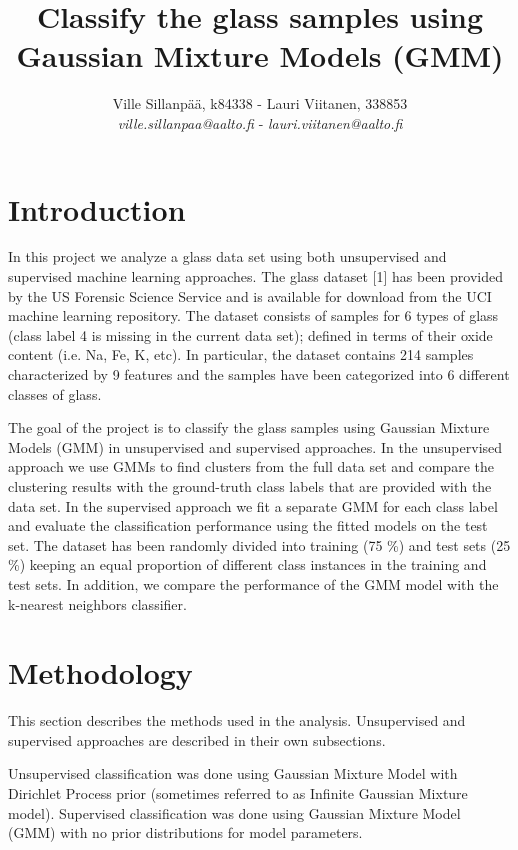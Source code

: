 \documentclass[a4paper]{article}
\title{Classify the glass samples using Gaussian Mixture Models (GMM)}
\author{Ville Sillanpää, k84338 - Lauri Viitanen, 338853 \\ 
       {\it ville.sillanpaa@aalto.fi} -
       {\it lauri.viitanen@aalto.fi}}
\begin{document}
\maketitle
\clearpage


\section{Introduction}

In this project we analyze a glass data set using both unsupervised and
supervised machine learning approaches. The glass dataset [1] has been
provided by the US Forensic Science Service and is available for download from
the UCI machine learning repository. The dataset consists of samples for 6
types of glass (class label 4 is missing in the current data set); defined in
terms of their oxide content (i.e. Na, Fe, K, etc). In particular, the dataset
contains 214 samples characterized by 9 features and the samples have been
categorized into 6 different classes of glass.

\par
The goal of the project is to classify the glass samples using Gaussian
Mixture Models (GMM) in unsupervised and supervised approaches. In the
unsupervised approach we use GMMs to find clusters from the full data set and
compare the clustering results with the ground-truth class labels that are
provided with the data set. In the supervised approach we fit a separate GMM
for each class label and evaluate the classification performance using the
fitted models on the test set. The dataset has been randomly divided into
training (75 \%) and test sets (25 \%) keeping an equal proportion of different
class instances in the training and test sets. In addition, we compare the
performance of the GMM model with the k-nearest neighbors classifier.

\section{Methodology}

This section describes the methods used in the analysis. Unsupervised and supervised approaches are described in their own subsections.

Unsupervised classification was done using Gaussian Mixture Model with Dirichlet Process prior (sometimes referred to as Infinite Gaussian Mixture model). Supervised classification was done using Gaussian Mixture Model (GMM) with no prior distributions for model parameters.
\end{document}
